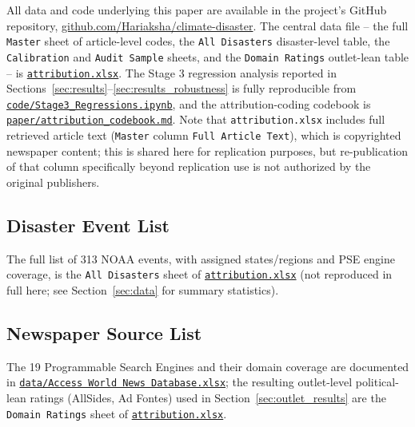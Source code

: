 \documentclass[12pt]{article}
\begin{document}
\begin{sloppypar}
All data and code underlying this paper are available in the project's
GitHub repository,
\href{https://github.com/Hariaksha/climate-disaster}{github.com/Hariaksha/climate-disaster}.
The central data file -- the full \texttt{Master} sheet of article-level
codes, the \texttt{All Disasters} disaster-level table, the
\texttt{Calibration} and \texttt{Audit Sample} sheets, and the
\texttt{Domain Ratings} outlet-lean table -- is
\href{https://github.com/Hariaksha/climate-disaster/blob/main/attribution.xlsx}{\texttt{attribution.xlsx}}.
The Stage 3 regression analysis reported in
Sections~\ref{sec:results}--\ref{sec:results_robustness} is fully
reproducible from
\href{https://github.com/Hariaksha/climate-disaster/blob/main/code/Stage3_Regressions.ipynb}{\texttt{code/Stage3\_Regressions.ipynb}},
and the attribution-coding codebook is
\href{https://github.com/Hariaksha/climate-disaster/blob/main/paper/attribution_codebook.md}{\texttt{paper/attribution\_codebook.md}}.
Note that \texttt{attribution.xlsx} includes full retrieved article text
(\texttt{Master} column \texttt{Full Article Text}), which is copyrighted
newspaper content; this is shared here for replication purposes, but
re-publication of that column specifically beyond replication use is not
authorized by the original publishers.
\end{sloppypar}

\subsection{Disaster Event List}

The full list of 313 NOAA events, with assigned states/regions and PSE
engine coverage, is the \texttt{All Disasters} sheet of
\href{https://github.com/Hariaksha/climate-disaster/blob/main/attribution.xlsx}{\texttt{attribution.xlsx}}
(not reproduced in full here; see Section~\ref{sec:data} for summary
statistics).

\subsection{Newspaper Source List}

\begin{sloppypar}
The 19 Programmable Search Engines and their domain coverage are
documented in
\href{https://github.com/Hariaksha/climate-disaster/blob/main/data/Access\%20World\%20News\%20Database.xlsx}{\texttt{data/Access World News Database.xlsx}};
the resulting outlet-level political-lean ratings (AllSides, Ad Fontes)
used in Section~\ref{sec:outlet_results} are the \texttt{Domain Ratings}
sheet of
\href{https://github.com/Hariaksha/climate-disaster/blob/main/attribution.xlsx}{\texttt{attribution.xlsx}}.
\end{sloppypar}
\end{document}
